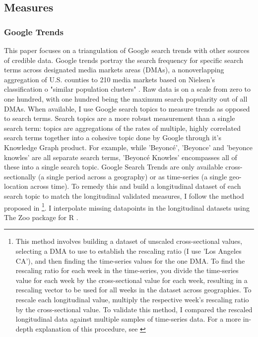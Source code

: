 

\subsection{Measures}

\subsubsection{Google Trends}
This paper focuses on a triangulation of Google search trends \citep{googletrends}
with other sources of credible data.
Google trends portray the search frequency for specific search terms across
designated media markets areas (DMAs), a nonoverlapping aggregation of U.S.
counties to 210 media markets based on Nielsen's classification o "similar population clusters" \citep{dma_key}.
Raw data is on a scale from zero to one hundred, with one hundred being the maximum search
popularity out of all DMAs. When available, I use Google search topics to
measure trends as opposed to search terms. Search topics are a more robust
measurement than a single search term: topics are aggregations of the rates of
multiple, highly correlated search terms together into a cohesive topic done
by Google through it's Knowledge Graph product. For
example, while 'Beyoncé', 'Beyonce' and 'beyonce knowles' are all separate
search terms, 'Beyoncé Knowles' encompasses all of these into a single search
topic. Google Search Trends are only available cross-sectionally (a single 
period across a geography) or as time-series (a single geo-location across
time). To remedy this and build a longitudinal dataset of each search topic 
to match the longitudinal validated measures, I follow the method proposed 
in \citet[][p. 5]{park_etal}\footnote{This method involves building a dataset of unscaled cross-sectional values,
selecting a DMA to use to establish the rescaling ratio (I use 'Los Angeles
CA'), and then finding the time-series values for the one DMA. To find the
rescaling ratio for each week in the time-series, you divide the time-series
value for each week by the cross-sectional value for each week, resulting in a
rescaling vector to be used for all weeks in the dataset across geographies. To
rescale each longitudinal value, multiply the respective week's rescaling ratio
by the cross-sectional value. To validate this method, I compared the rescaled
longitudinal data against multiple samples of time-series data. For a more
in-depth explanation of this procedure, see \citet[p. 5]{park_etal}}. I interpolate 
missing datapoints in the longitudinal datasets using The Zoo package for R \citep{zoo}.

